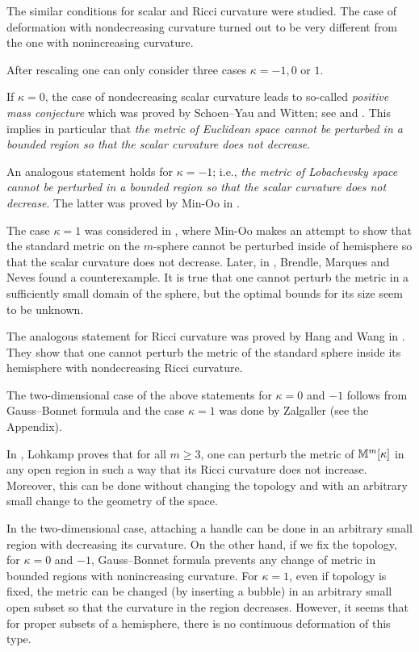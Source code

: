\documentclass[oneside,a4paper]{article}
\begin{document}
The similar conditions for scalar and Ricci curvature were studied.
The case of deformation with nondecreasing  curvature turned out to be very different from the one with
nonincreasing curvature. 

After rescaling one can only consider three cases $\kappa=-1,0$ or $1$.

If $\kappa=0$,
the case of nondecreasing scalar curvature leads to so-called
\emph{positive mass conjecture} which was proved by Schoen--Yau and 
Witten;
see
\cite{schoen-yau} and 
\cite{witten}.
This implies in particular that
\textit{the metric of Euclidean space cannot be perturbed in a bounded region so that the scalar curvature does not decrease}.

An analogous statement holds for $\kappa=-1$;
i.e., \textit{the metric of Lobachevsky space cannot be perturbed in a bounded region so that the scalar curvature does not decrease}.
The latter was proved by Min-Oo in \cite{oo-lob}.

The case $\kappa=1$ was considered in \cite{oo},
where Min-Oo  makes an attempt to show that the standard metric on the $m$-sphere
cannot be perturbed inside of hemisphere so that the scalar curvature does
not decrease.
Later, in \cite{brendle-marques-neves}, Brendle, Marques and Neves found a counterexample.
It is true that one cannot perturb the metric in a sufficiently small domain of the sphere,
but the optimal bounds for its size seem to be unknown.

The analogous statement for Ricci curvature was proved by Hang and Wang in \cite{hang-wang}.
They show that one cannot perturb the metric of the standard sphere inside its hemisphere with nondecreasing Ricci curvature.

The two-dimensional case of the above statements for $\kappa=0$ and $-1$ follows from Gauss--Bonnet formula
and the case $\kappa=1$ was done by Zalgaller (see the Appendix).


In \cite{lohkamp-Ricc}, Lohkamp proves that
for all $m\ge3$,
one can perturb the metric of $\mathbb{M}^m[\kappa]$ in any open region
in such a way that its Ricci curvature does not increase.
Moreover, this can be done without changing the topology 
and with an arbitrary small change to the geometry of the space.

In the two-dimensional case, attaching a handle can be done in an arbitrary small region with decreasing its curvature.
On the other hand, if we fix the topology, for $\kappa=0$ and $-1$,
Gauss--Bonnet formula prevents any change of metric in bounded regions
with nonincreasing curvature.
For $\kappa=1$, even if topology is fixed,
the metric can be changed (by inserting a bubble) in an arbitrary small open subset
so that the curvature in the region decreases. However, it seems that for proper
subsets of a hemisphere, there is no continuous deformation of this type.
\end{document}
